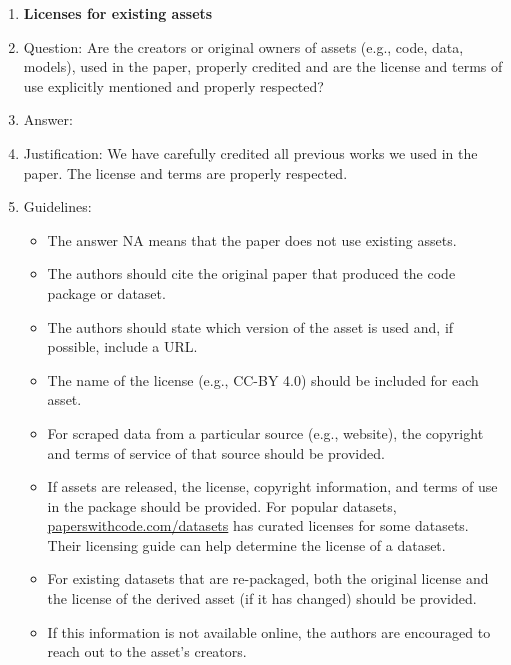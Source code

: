 \documentclass{article}
\begin{document}
\begin{enumerate}
\item {\bf Licenses for existing assets}
    \item[] Question: Are the creators or original owners of assets (e.g., code, data, models), used in the paper, properly credited and are the license and terms of use explicitly mentioned and properly respected?
    \item[] Answer: \answerYes{} %
    \item[] Justification: We have carefully credited all previous works we used in the paper. The license and terms are properly respected.
    \item[] Guidelines:
    \begin{itemize}
        \item The answer NA means that the paper does not use existing assets.
        \item The authors should cite the original paper that produced the code package or dataset.
        \item The authors should state which version of the asset is used and, if possible, include a URL.
        \item The name of the license (e.g., CC-BY 4.0) should be included for each asset.
        \item For scraped data from a particular source (e.g., website), the copyright and terms of service of that source should be provided.
        \item If assets are released, the license, copyright information, and terms of use in the package should be provided. For popular datasets, \url{paperswithcode.com/datasets} has curated licenses for some datasets. Their licensing guide can help determine the license of a dataset.
        \item For existing datasets that are re-packaged, both the original license and the license of the derived asset (if it has changed) should be provided.
        \item If this information is not available online, the authors are encouraged to reach out to the asset's creators.
    \end{itemize}


\end{enumerate}
\end{document}
